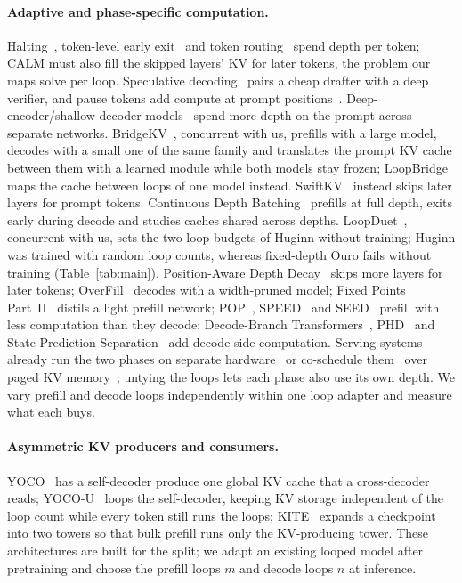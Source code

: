 \documentclass[11pt]{article}
\begin{document}
\paragraph{Adaptive and phase-specific computation.} Halting~\citep{act,pondernet}, token-level early
exit~\citep{deebert,depthadaptive,calm,layerskip,skipdecode} and token routing~\citep{mod} spend depth per token; CALM must also
fill the skipped layers' KV for later tokens, the problem our maps solve per loop. Speculative
decoding~\citep{specdecoding,specsampling} pairs a cheap drafter with a deep verifier, and pause tokens add compute at
prompt positions~\citep{pausetokens}. Deep-encoder/shallow-decoder models~\citep{deepshallow,llm2slm,tandem} spend more
depth on the prompt across separate networks. BridgeKV~\citep{bridgekv}, concurrent with us, prefills with a large
model, decodes with a small one of the same family and translates the prompt KV cache between them with a learned
module while both models stay frozen; LoopBridge maps the cache between loops of one model instead. SwiftKV~\citep{swiftkv} instead skips later layers for prompt tokens. Continuous Depth Batching~\citep{cdb} prefills at full depth, exits early during
decode and studies caches shared across depths. LoopDuet~\citep{loopduet}, concurrent with us, sets the two loop
budgets of Huginn without training; Huginn was trained with random loop counts, whereas fixed-depth Ouro fails without
training (Table~\ref{tab:main}). Position-Aware
Depth Decay~\citep{padd} skips more layers for later tokens; OverFill~\citep{overfill} decodes with a width-pruned model;
Fixed Points Part~II~\citep{fixedpoints2} distils a light prefill network; POP~\citep{pop}, SPEED~\citep{speed} and SEED~\citep{seedemit}
prefill with less computation than they decode; Decode-Branch Transformers~\citep{decodebranch}, PHD~\citep{phd} and
State-Prediction Separation~\citep{sps} add decode-side computation. Serving systems already run the two phases on
separate hardware~\citep{distserve,splitwise,mooncake} or co-schedule them~\citep{sarathiserve} over paged KV
memory~\citep{vllm}; untying the
loops lets each phase also use its own depth. We vary prefill and decode loops independently within one loop adapter
and measure what each buys.

\paragraph{Asymmetric KV producers and consumers.} YOCO~\citep{yoco} has a self-decoder produce one global KV cache that
a cross-decoder reads; YOCO-U~\citep{yocou} loops the self-decoder, keeping KV storage independent of the loop count
while every token still runs the loops; KITE~\citep{kite} expands a checkpoint into two towers so that bulk prefill runs
only the KV-producing tower. These architectures are built for the split; we adapt an existing looped model after
pretraining and choose the prefill loops $m$ and decode loops $n$ at inference.
\end{document}
